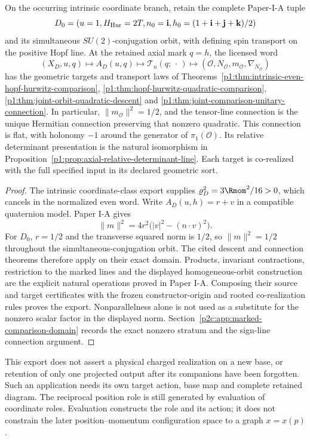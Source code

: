 \documentclass[12pt,a4paper]{article}
\begin{document}
\begin{corollary}
\label{p2c:cor:intrinsic-joint-comparison-role-export}
On the occurring intrinsic coordinate branch, retain the complete Paper-I-A tuple
\[
 D_0=(u=1,H_{\rm Hur}=2T,n_0=\mathbf i,
             h_0=(1+\mathbf i+\mathbf j+\mathbf k)/2)
\]
and its simultaneous $SU(2)$-conjugation orbit, with defining spin transport on
the positive Hopf line. At the retained axial mark $q=h$, the licensed word
\[
 (X_D,u,q)\longmapsto A_D(u,q)
 \longmapsto\mathcal T_u(q;\,\cdot\,)
 \longmapsto(\mathcal O,N_{\mathcal O},m_{\mathcal O},
                         \nabla_{N_{\mathcal O}})
\]
has the geometric targets and transport laws of
Theorems~\ref{p1:thm:intrinsic-even-hopf-hurwitz-comparison},
\ref{p1:thm:hopf-hurwitz-quadratic-comparison},
\ref{p1:thm:joint-orbit-quadratic-descent} and
\ref{p1:thm:joint-comparison-unitary-connection}.
In particular, $\|m_{\mathcal O}\|^2=1/2$, and the tensor-line connection is
the unique Hermitian connection preserving that nonzero quadratic.
This connection is flat, with holonomy $-1$ around the generator of
$\pi_1(\mathcal O)$. Its relative determinant presentation is the natural isomorphism in
Proposition~\ref{p1:prop:axial-relative-determinant-line}.
Each target is co-realized with the full specified input in its declared
geometric sort.
\end{corollary}
\begin{proof}
The intrinsic coordinate-class export supplies
$\varrho_D^2=3\Rmom^2/16>0$, which cancels in the normalized even word.
Write $A_D(u,h)=r+v$ in a compatible quaternion model. Paper I-A gives
\[
 \|m\|^2=4r^2\bigl(|v|^2-(n\cdot v)^2\bigr).
\]
For $D_0$, $r=1/2$ and the transverse squared norm is $1/2$, so
$\|m\|^2=1/2$ throughout the simultaneous-conjugation orbit. The cited
descent and connection theorems therefore apply on their exact domain.
Products, invariant contractions, restriction to the marked lines and the
displayed homogeneous-orbit construction are the explicit natural operations
proved in Paper I-A. Composing their source and target certificates with the
frozen constructor-origin and rooted co-realization rules proves the export.
Nonparallelness alone is not used as a substitute for the nonzero scalar
factor in the displayed norm. Section~\ref{p2c:app:marked-comparison-domain}
records the exact nonzero stratum and the sign-line connection argument.
\end{proof}

This export does not assert a physical charged realization on a new
base, or retention of only one projected output after its companions
have been forgotten.  Such an application needs its own target action,
base map and complete retained diagram.  The reciprocal position role
is still generated by evaluation of coordinate roles.  Evaluation
constructs the role and its action; it does not constrain the later
position--momentum configuration space to a graph \(x=x(p)\).
\end{document}
